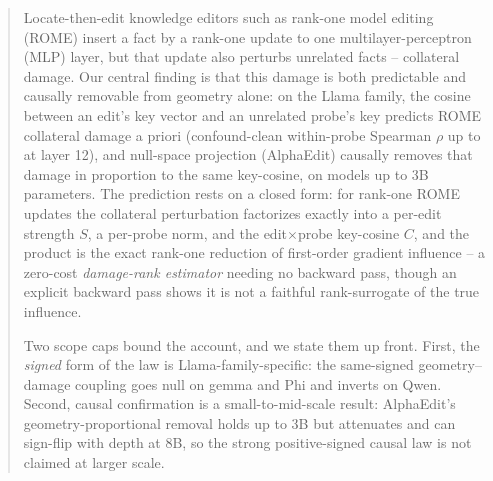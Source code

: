 \begin{abstract}
Locate-then-edit knowledge editors such as rank-one model editing (ROME)
insert a fact by a rank-one update to one multilayer-perceptron (MLP) layer,
but that update also perturbs unrelated facts -- collateral damage. Our
central finding is that this damage is both predictable and causally removable
from geometry alone: on the Llama family, the cosine between an edit's key
vector and an unrelated probe's key predicts ROME collateral damage a priori
(confound-clean within-probe Spearman $\rho$ up to \gWithinLtwelve{} at layer
12), and null-space projection (AlphaEdit) causally removes that damage in
proportion to the same key-cosine, on models up to 3B parameters. The
prediction rests on a closed form: for rank-one ROME updates the collateral
perturbation factorizes exactly into a per-edit strength $S$, a per-probe norm,
and the edit$\times$probe key-cosine $C$, and the product \SxC{} is the exact
rank-one reduction of first-order gradient influence -- a zero-cost \emph{damage-rank
estimator} needing no backward pass, though an explicit backward pass shows it
is not a faithful rank-surrogate of the true influence.

Two scope caps bound the account, and we state them up front. First, the
\emph{signed} form of the law is Llama-family-specific: the same-signed
geometry--damage coupling goes null on gemma and Phi and inverts on Qwen.
Second, causal confirmation is a small-to-mid-scale result: AlphaEdit's
geometry-proportional removal holds up to 3B but attenuates and can sign-flip
with depth at 8B, so the strong positive-signed causal law is not claimed at
larger scale.


\end{abstract}
